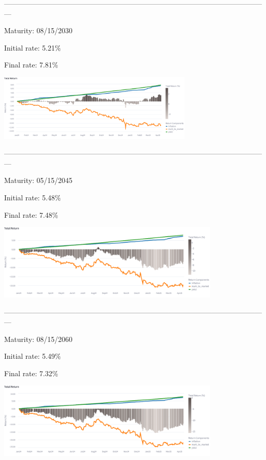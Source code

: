 \documentclass[10pt]{report}
\begin{document}
---------------------------------------------------------------------------------------------------------------

Maturity: 08/15/2030

Initial rate: 5.21\%

Final rate: 7.81\%
\vspace{0.25cm}
\begin{center}
	\includegraphics[width=0.7\textwidth]{img/return_B30.png}
\end{center}

---------------------------------------------------------------------------------------------------------------

Maturity: 05/15/2045

Initial rate: 5.48\%

Final rate: 7.48\%
\vspace{0.25cm}
\begin{center}
	\includegraphics[width=0.8\textwidth]{img/return_B45.png}
\end{center}

---------------------------------------------------------------------------------------------------------------

Maturity: 08/15/2060

Initial rate: 5.49\%

Final rate: 7.32\%
\vspace{0.25cm}
\begin{center}
	\includegraphics[width=0.8\textwidth]{img/return_B60.png}
\end{center}

\vspace{0.5cm}




\pagebreak
\printbibliography
\end{document}
